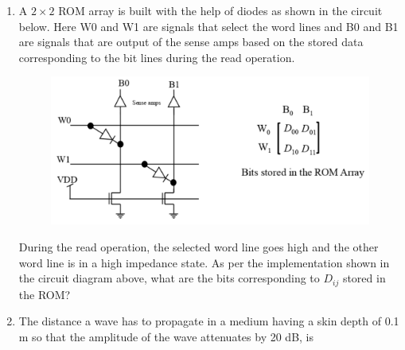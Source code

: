 \documentclass[a4paper, 11pt]{article}
\begin{document}
\begin{enumerate}
    \item A $2 \times 2$ ROM array is built with the help of diodes as shown in the circuit below. Here W0 and W1 are signals that select the word lines and B0 and B1 are signals that are output of the sense amps based on the stored data corresponding to the bit lines during the read operation.
    \begin{figure}[H]
        \centering
        \includegraphics[width=0.5\columnwidth]{figs/q32.png}
        \caption*{}
        \label{fig:q32}
    \end{figure}
    During the read operation, the selected word line goes high and the other word line is in a high impedance state. As per the implementation shown in the circuit diagram above, what are the bits corresponding to $D_{ij}$  stored in the ROM?
    \begin{enumerate}
    \end{enumerate}

    \hfill{}

    \item The distance  a wave has to propagate in a medium having a skin depth of 0.1 m so that the amplitude of the wave attenuates by 20 dB, is
    \begin{enumerate}
    \end{enumerate}


\end{enumerate}
\end{document}
